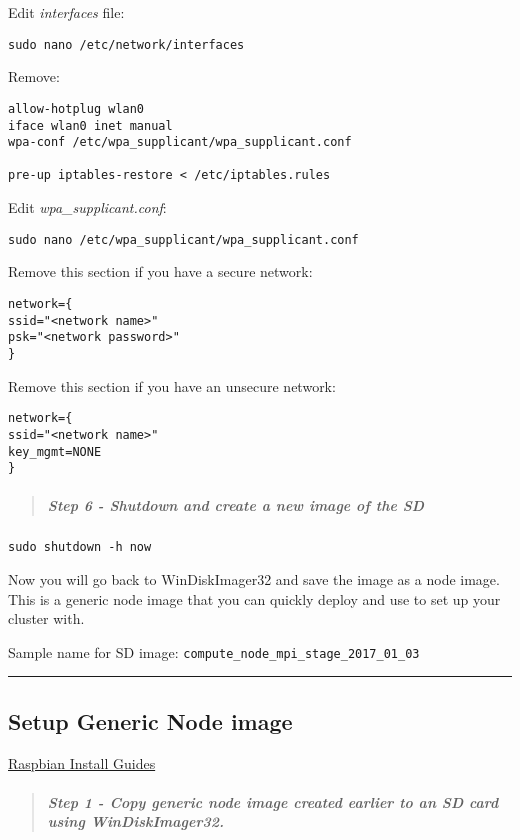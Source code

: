 \documentclass[]{article}
\let\oldsubparagraph\subparagraph
\renewcommand{\subparagraph}[1]{\oldsubparagraph{#1}\mbox{}}
\begin{document}
Edit \emph{interfaces} file:

\texttt{sudo\ nano\ /etc/network/interfaces}

Remove:

\begin{verbatim}
allow-hotplug wlan0
iface wlan0 inet manual
wpa-conf /etc/wpa_supplicant/wpa_supplicant.conf

pre-up iptables-restore < /etc/iptables.rules
\end{verbatim}

Edit \emph{wpa\_supplicant.conf}:

\texttt{sudo\ nano\ /etc/wpa\_supplicant/wpa\_supplicant.conf}

Remove this section if you have a secure network:

\begin{verbatim}
network={
ssid="<network name>"
psk="<network password>"
}
\end{verbatim}

Remove this section if you have an unsecure network:

\begin{verbatim}
network={
ssid="<network name>"
key_mgmt=NONE
}
\end{verbatim}

\begin{quote}
\mbox{}%
\subparagraph{Step 6 - Shutdown and create a new image of the
SD}\label{step-6---shutdown-and-create-a-new-image-of-the-sd}
\end{quote}

\texttt{sudo\ shutdown\ -h\ now}

Now you will go back to WinDiskImager32 and save the image as a node
image. This is a generic node image that you can quickly deploy and use
to set up your cluster with.

Sample name for SD image:
\texttt{compute\_node\_mpi\_stage\_2017\_01\_03}

\begin{center}\rule{0.5\linewidth}{\linethickness}\end{center}

\subsection{Setup Generic Node image}\label{setup-generic-node-image}

\href{https://www.raspberrypi.org/documentation/installation/installing-images/}{Raspbian
Install Guides}

\begin{quote}
\mbox{}%
\subparagraph{Step 1 - Copy generic node image created earlier to an SD
card using
WinDiskImager32.}\label{step-1---copy-generic-node-image-created-earlier-to-an-sd-card-using-windiskimager32.}
\end{quote}
\end{document}

